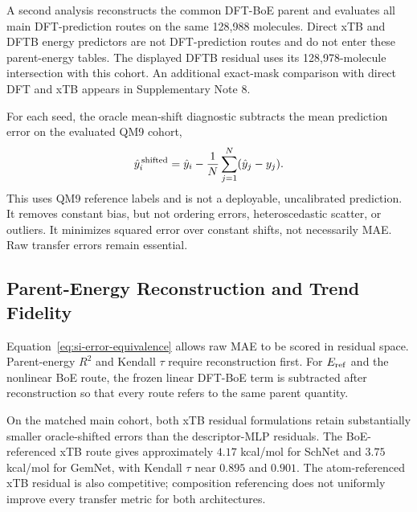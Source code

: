 A second analysis reconstructs the common DFT-BoE parent and evaluates all main DFT-prediction routes on the same 128,988 molecules. Direct xTB and DFTB energy predictors are not DFT-prediction routes and do not enter these parent-energy tables. The displayed DFTB residual uses its 128,978-molecule intersection with this cohort. An additional exact-mask comparison with direct DFT and xTB appears in Supplementary Note 8.

For each seed, the oracle mean-shift diagnostic subtracts the mean prediction error on the evaluated QM9 cohort,
\begin{equation}
 \hat y_i^{\,\rm shifted}=\hat y_i-
 \frac{1}{N}\sum_{j=1}^{N}(\hat y_j-y_j).
 \label{eq:si-oracle}
\end{equation}
This uses QM9 reference labels and is not a deployable, uncalibrated prediction. It removes constant bias, but not ordering errors, heteroscedastic scatter, or outliers. It minimizes squared error over constant shifts, not necessarily MAE. Raw transfer errors remain essential.


\clearpage
\subsection*{Parent-Energy Reconstruction and Trend Fidelity}
Equation~\ref{eq:si-error-equivalence} allows raw MAE to be scored in residual space. Parent-energy \(R^2\) and Kendall \(\tau\) require reconstruction first. For \(E_{\rm ref}\) and the nonlinear BoE route, the frozen linear DFT-BoE term is subtracted after reconstruction so that every route refers to the same parent quantity.

On the matched main cohort, both xTB residual formulations retain substantially smaller oracle-shifted errors than the descriptor-MLP residuals. The BoE-referenced xTB route gives approximately \(4.17\) kcal/mol for SchNet and \(3.75\) kcal/mol for GemNet, with Kendall \(\tau\) near \(0.895\) and \(0.901\). The atom-referenced xTB residual is also competitive; composition referencing does not uniformly improve every transfer metric for both architectures.

